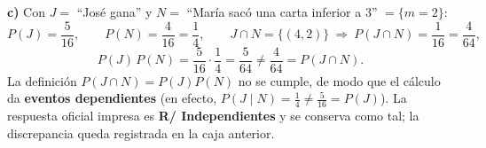 \documentclass[11pt]{article}
\begin{document}
\begin{resp}
\textbf{c)} Con $J=$ ``José gana'' y $N=$ ``María sacó una carta inferior a 3'' $=\{m=2\}$:
\[
P(J)=\frac{5}{16},\qquad
P(N)=\frac{4}{16}=\frac14,\qquad
J\cap N=\{(4,2)\}\ \Rightarrow\ P(J\cap N)=\frac{1}{16}=\frac{4}{64},
\]
\[
P(J)\,P(N)=\frac{5}{16}\cdot\frac14=\frac{5}{64}\neq\frac{4}{64}=P(J\cap N).
\]
La definición $P(J\cap N)=P(J)P(N)$ no se cumple, de modo que el cálculo da \textbf{eventos
dependientes} (en efecto, $P(J\mid N)=\frac14\neq\frac{5}{16}=P(J)$). La respuesta oficial
impresa es \textbf{R/ Independientes} y se conserva como tal; la discrepancia queda registrada
en la caja anterior.
\end{resp}
\end{document}
